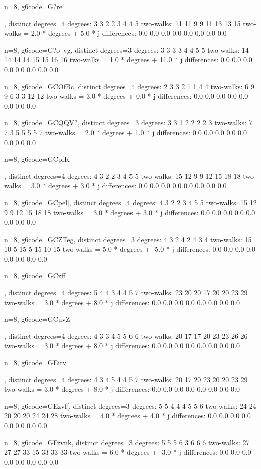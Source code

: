 n=8, g6code=G?re`{, distinct degrees=4
degrees: 3 3 2 2 3 4 4 5 
two-walks: 11 11 9 9 11 13 13 15 
two-walks = 2.0 * degrees + 5.0 * j
differences: 0.0 0.0 0.0 0.0 0.0 0.0 0.0 0.0 

n=8, g6code=G?o~vg, distinct degrees=3
degrees: 3 3 3 3 4 4 5 5 
two-walks: 14 14 14 14 15 15 16 16 
two-walks = 1.0 * degrees + 11.0 * j
differences: 0.0 0.0 0.0 0.0 0.0 0.0 0.0 0.0 

n=8, g6code=GCOfBc, distinct degrees=4
degrees: 2 3 3 2 1 1 4 4 
two-walks: 6 9 9 6 3 3 12 12 
two-walks = 3.0 * degrees + 0.0 * j
differences: 0.0 0.0 0.0 0.0 0.0 0.0 0.0 0.0 

n=8, g6code=GCQQV?, distinct degrees=3
degrees: 3 3 1 2 2 2 2 3 
two-walks: 7 7 3 5 5 5 5 7 
two-walks = 2.0 * degrees + 1.0 * j
differences: 0.0 0.0 0.0 0.0 0.0 0.0 0.0 0.0 

n=8, g6code=GCpfK{, distinct degrees=4
degrees: 4 3 2 2 3 4 5 5 
two-walks: 15 12 9 9 12 15 18 18 
two-walks = 3.0 * degrees + 3.0 * j
differences: 0.0 0.0 0.0 0.0 0.0 0.0 0.0 0.0 

n=8, g6code=GCpel[, distinct degrees=4
degrees: 4 3 2 2 3 4 5 5 
two-walks: 15 12 9 9 12 15 18 18 
two-walks = 3.0 * degrees + 3.0 * j
differences: 0.0 0.0 0.0 0.0 0.0 0.0 0.0 0.0 

n=8, g6code=GCZTeg, distinct degrees=3
degrees: 4 3 2 4 2 4 3 4 
two-walks: 15 10 5 15 5 15 10 15 
two-walks = 5.0 * degrees + -5.0 * j
differences: 0.0 0.0 0.0 0.0 0.0 0.0 0.0 0.0 

n=8, g6code=GCzff{, distinct degrees=4
degrees: 5 4 4 3 4 4 5 7 
two-walks: 23 20 20 17 20 20 23 29 
two-walks = 3.0 * degrees + 8.0 * j
differences: 0.0 0.0 0.0 0.0 0.0 0.0 0.0 0.0 

n=8, g6code=GCuvZ{, distinct degrees=4
degrees: 4 3 3 4 5 5 6 6 
two-walks: 20 17 17 20 23 23 26 26 
two-walks = 3.0 * degrees + 8.0 * j
differences: 0.0 0.0 0.0 0.0 0.0 0.0 0.0 0.0 

n=8, g6code=GEirv{, distinct degrees=4
degrees: 4 3 4 5 4 4 5 7 
two-walks: 20 17 20 23 20 20 23 29 
two-walks = 3.0 * degrees + 8.0 * j
differences: 0.0 0.0 0.0 0.0 0.0 0.0 0.0 0.0 

n=8, g6code=GEzvf[, distinct degrees=3
degrees: 5 5 4 4 4 5 5 6 
two-walks: 24 24 20 20 20 24 24 28 
two-walks = 4.0 * degrees + 4.0 * j
differences: 0.0 0.0 0.0 0.0 0.0 0.0 0.0 0.0 

n=8, g6code=GFzvnk, distinct degrees=3
degrees: 5 5 5 6 3 6 6 6 
two-walks: 27 27 27 33 15 33 33 33 
two-walks = 6.0 * degrees + -3.0 * j
differences: 0.0 0.0 0.0 0.0 0.0 0.0 0.0 0.0 

}}}}}
